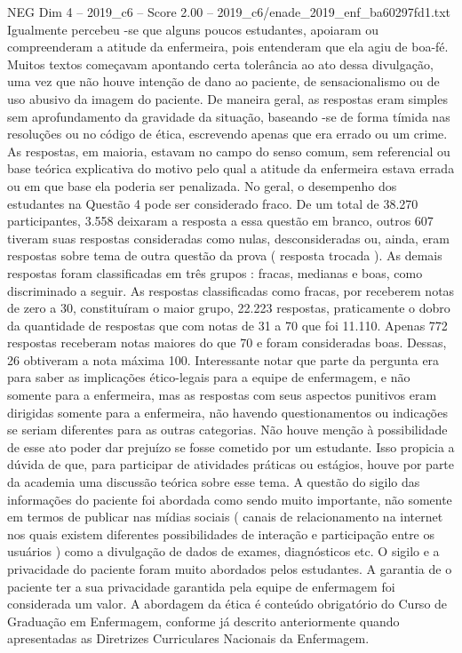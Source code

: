 \begin{textsample}{NEG Dim 4 – 2019\_c6 – Score 2.00 – 2019\_c6/enade\_2019\_enf\_ba60297fd1.txt}
Igualmente percebeu -se que alguns poucos estudantes, apoiaram ou compreenderam a atitude da enfermeira, pois entenderam que ela agiu de boa-fé.
Muitos textos começavam apontando certa tolerância ao ato dessa divulgação, uma vez que não houve intenção de dano ao paciente, de sensacionalismo ou de uso abusivo da imagem do paciente.
De maneira geral, as respostas eram simples sem aprofundamento da gravidade da situação, baseando -se de forma tímida nas resoluções ou no código de ética, escrevendo apenas que era errado ou um crime.
As respostas, em maioria, estavam no campo do senso comum, sem referencial ou base teórica explicativa do motivo pelo qual a atitude da enfermeira estava errada ou em que base ela poderia ser penalizada.
No geral, o desempenho dos estudantes na Questão 4 pode ser considerado fraco.
De um total de 38.270 participantes, 3.558 deixaram a resposta a essa questão em branco, outros 607 tiveram suas respostas consideradas como nulas, desconsideradas ou, ainda, eram respostas sobre tema de outra questão da prova ( resposta trocada ).
As demais respostas foram classificadas em três grupos : fracas, medianas e boas, como discriminado a seguir.
As respostas classificadas como fracas, por receberem notas de zero a 30, constituíram o maior grupo, 22.223 respostas, praticamente o dobro da quantidade de respostas que com notas de 31 a 70 que foi 11.110.
Apenas 772 respostas receberam notas maiores do que 70 e foram consideradas boas.
Dessas, 26 obtiveram a nota máxima 100.
Interessante notar que parte da pergunta era para saber as implicações ético-legais para a equipe de enfermagem, e não somente para a enfermeira, mas as respostas com seus aspectos punitivos eram dirigidas somente para a enfermeira, não havendo questionamentos ou indicações se seriam diferentes para as outras categorias.
Não houve menção à possibilidade de esse ato poder dar prejuízo se fosse cometido por um estudante.
Isso propicia a dúvida de que, para participar de atividades práticas ou estágios, houve por parte da academia uma discussão teórica sobre esse tema.
A questão do sigilo das informações do paciente foi abordada como sendo muito importante, não somente em termos de publicar nas mídias sociais ( canais de relacionamento na internet nos quais existem diferentes possibilidades de interação e participação entre os usuários ) como a divulgação de dados de exames, diagnósticos etc.
O sigilo e a privacidade do paciente foram muito abordados pelos estudantes.
A garantia de o paciente ter a sua privacidade garantida pela equipe de enfermagem foi considerada um valor.
A abordagem da ética é conteúdo obrigatório do Curso de Graduação em Enfermagem, conforme já descrito anteriormente quando apresentadas as Diretrizes Curriculares Nacionais da Enfermagem.

\end{textsample}
